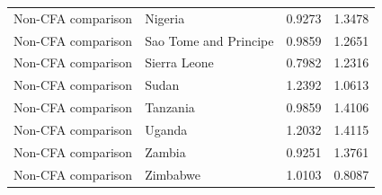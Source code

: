 \begin{table}
\begin{tabular}[t]{llrr}
Non-CFA comparison & Nigeria & 0.9273 & 1.3478\\
Non-CFA comparison & Sao Tome and Principe & 0.9859 & 1.2651\\
Non-CFA comparison & Sierra Leone & 0.7982 & 1.2316\\
\addlinespace
Non-CFA comparison & Sudan & 1.2392 & 1.0613\\
Non-CFA comparison & Tanzania & 0.9859 & 1.4106\\
Non-CFA comparison & Uganda & 1.2032 & 1.4115\\
Non-CFA comparison & Zambia & 0.9251 & 1.3761\\
Non-CFA comparison & Zimbabwe & 1.0103 & 0.8087\\
\bottomrule
\end{tabular}
\end{table}